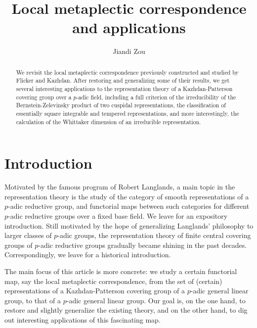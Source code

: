 \documentclass{amsart}
\numberwithin{equation}{section}
\begin{document}
	
	\title{Local metaplectic correspondence and applications}
	\author{Jiandi Zou}
	\address{Mathematics Department, Technion -- Israel Institute of Technology, Haifa 3200003, Israel}
	
	\begin{abstract}
		
		We revisit the local metaplectic correspondence previously constructed and studied by Flicker and Kazhdan. After restoring and generalizing some of their results, we get several interesting applications to the representation theory of a Kazhdan-Patterson covering group over a $p$-adic field, including a full criterion of the irreducibility of the Bernstein-Zelevinsky product of two cuspidal representations, the classification of essentially square integrable and tempered representations, and more interestingly, the calculation of the Whittaker dimension of an irreducible representation.
		
	\end{abstract}	
	\maketitle
	\setcounter{tocdepth}{1}
	\tableofcontents
	
	\section{Introduction}
	
	Motivated by the famous program of Robert Langlands, a main topic in the representation theory %
	is the study of the category of smooth representations of a $p$-adic reductive group, and functorial maps between such categories for different $p$-adic reductive groups over a fixed base field. We leave \cite{borel1979automorphic} for an expository introduction. Still motivated by the hope of generalizing Langlands' philosophy to larger classes of $p$-adic groups, the representation theory of finite central covering groups of $p$-adic reductive groups gradually became shining in the past decades. Correspondingly, we leave \cite{gan2018groups} for a historical introduction.  
	
	The main focus of this article is more concrete: we study a certain functorial map, say the local metaplectic correspondence, from the set of (certain) representations of a Kazhdan-Patterson covering group of a $p$-adic general linear group, to that of a $p$-adic general linear group. Our goal is, on the one hand, to restore and slightly generalize the existing theory, and on the other hand, to dig out interesting applications of this fascinating map.
	
\end{document}
